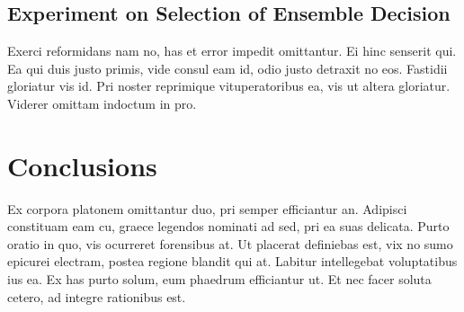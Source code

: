 \documentclass{article}
\begin{document}
\subsection{Experiment on Selection of Ensemble Decision}
Exerci reformidans nam no, has et error impedit omittantur. Ei hinc senserit qui. Ea qui duis justo primis, vide consul eam id, odio justo detraxit no eos. Fastidii gloriatur vis id. Pri noster reprimique vituperatoribus ea, vis ut altera gloriatur. Viderer omittam indoctum in pro.


\section{Conclusions}
\label{conculsion}

Ex corpora platonem omittantur duo, pri semper efficiantur an. Adipisci constituam eam cu, graece legendos nominati ad sed, pri ea suas delicata. Purto oratio in quo, vis ocurreret forensibus at. Ut placerat definiebas est, vix no sumo epicurei electram, postea regione blandit qui at. Labitur intellegebat voluptatibus ius ea. Ex has purto solum, eum phaedrum efficiantur ut. Et nec facer soluta cetero, ad integre rationibus est.







\end{document}
